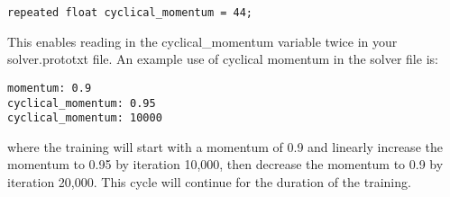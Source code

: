 \documentclass{article} %
\begin{document}
\begin{lstlisting}
repeated float cyclical_momentum = 44; 
\end{lstlisting}
This enables reading in the cyclical\_momentum variable twice in your solver.prototxt file.  An example use of cyclical momentum in the solver file is:
\begin{lstlisting}
momentum: 0.9
cyclical_momentum: 0.95
cyclical_momentum: 10000
\end{lstlisting}
where the training will start with a momentum of 0.9 and linearly increase the momentum to 0.95 by iteration 10,000, then decrease the momentum to 0.9 by iteration 20,000.  This cycle will continue for the duration of the training.
\end{document}
